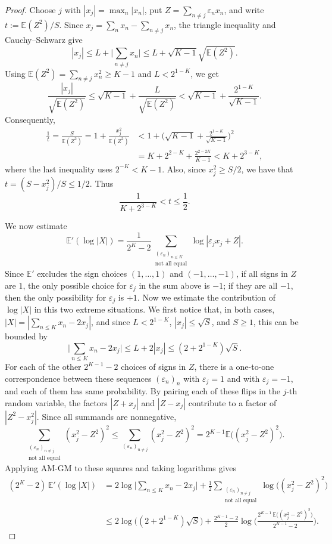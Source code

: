 \documentclass[10pt,a4paper]{amsart}
\newcommand{\EE}{\mathbb{E}}
\begin{document}
\begin{proof}
Choose $j$ with $|x_j|=\max_n|x_n|$, put $Z = \sum_{n\neq j}\varepsilon_n x_n$, and write $t := \EE(Z^2)/S$. Since $x_j=\sum_nx_n-\sum_{n\neq j}x_n$, the triangle inequality and Cauchy--Schwarz give
$$ |x_j|\leq L+\bigg|\sum_{n\neq j}x_n\bigg|
\leq L+\sqrt{K-1}\sqrt{\EE(Z^2)}. $$
Using $\EE(Z^2)=\sum_{n\neq j}x_n^2\geq K-1$ and $L<2^{1-K}$, we get
$$ \frac{|x_j|}{\sqrt{\EE(Z^2)}}
\leq\sqrt{K-1}+\frac{L}{\sqrt{\EE(Z^2)}}
<\sqrt{K-1}+\frac{2^{1-K}}{\sqrt{K-1}}. $$
Consequently,
\begin{align*}
\frac1t=\frac{S}{\EE(Z^2)}=1+\frac{x_j^2}{\EE(Z^2)}
&<1+\bigg(\sqrt{K-1}+\frac{2^{1-K}}{\sqrt{K-1}}\bigg)^2\\
&=K+2^{2-K}+\frac{2^{2-2K}}{K-1}<K+2^{3-K},
\end{align*}
where the last inequality uses $2^{-K}<K-1$. Also, since $x_j^2\geq S/2$, we have that $t=(S-x_j^2)/S\leq 1/2$. Thus
\begin{equation}\label{equation variance fraction}
\frac1{K+2^{3-K}}<t\leq\frac{1}{2}.
\end{equation}

We now estimate 
$$\EE'(\log|X|)=\frac{1}{2^K-2}\sum_{\substack{(\varepsilon_n)_{n\leq K}\\ \text{not all equal}}} \log|\varepsilon_jx_j+Z|.$$ 
Since $\EE'$ excludes the sign choices $(1,\ldots,1)$ and $(-1,\ldots,-1)$, if all signs in $Z$ are $1$, the only possible choice for $\varepsilon_j$ in the sum above is $-1$; if they are all $-1$, then the only possibility for $\varepsilon_j$ is $+1$. Now we estimate the contribution of $\log |X|$ in this two extreme situations. We first notice that, in both cases,  $|X|=|\sum_{n\leq K} x_n-2x_j|$, and since $L<2^{1-K}$, $|x_j|\leq\sqrt{S}$, and $S\geq1$, this can be bounded by
$$ \bigg|\sum_{n\leq K} x_n-2x_j\bigg|\leq L+2|x_j|\leq(2+2^{1-K})\sqrt{S}. $$
For each of the other $2^{K-1}-2$ choices of signs in $Z$, there is a one-to-one correspondence between these sequences $(\varepsilon_n)_{n}$ with $\varepsilon_j=1$ and with $\varepsilon_j=-1$, and each of them has same probability. By pairing each of these flips in the $j$-th random variable, the factors $|Z+x_j|$ and $|Z-x_j|$ contribute to a factor of $|Z^2-x_j^2|$. Since all summands are nonnegative,
$$ \sum_{\substack{(\varepsilon_n)_{n\neq j}\\ \text{not all equal}}}(x_j^2-Z^2)^2
\leq\sum_{(\varepsilon_n)_{n\neq j}}(x_j^2-Z^2)^2
=2^{K-1}\EE\big((x_j^2-Z^2)^2\big). $$
Applying AM-GM to these squares and taking logarithms gives
\begin{align}
(2^K-2)\,\EE'(\log|X|) &=2\log\bigg|\sum_{n\leq K} x_n-2x_j\bigg| +\frac{1}{2}\sum_{\substack{(\varepsilon_n)_{n\neq j}\\ \text{not all equal}}} \log\big((x_j^2-Z^2)^2\big) \nonumber \\
&\leq 2\log\big((2+2^{1-K})\sqrt{S}\big) +\frac{2^{K-1}-2}{2} \log\bigg(\frac{2^{K-1}\,\EE\big((x_j^2-Z^2)^2\big)}{2^{K-1}-2}\bigg). \label{equation moment bound}
\end{align}


\end{proof}
\end{document}

